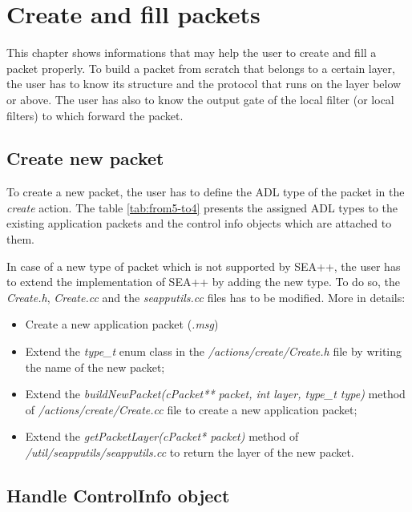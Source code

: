 

\chapter{Create and fill packets}
\label{ch:appendix-C}

This chapter shows informations that may help the user to create and fill a packet properly. To build a packet from scratch that belongs to a certain layer, the user has to know its structure and the protocol that runs on the layer below or above. The user has also to know the output gate of the local filter (or local filters) to which forward the packet.

\section{Create new packet}

To create a new packet, the user has to define the ADL type of the packet in the \emph{create} action. The table \ref{tab:from5-to4} presents the assigned ADL types to the existing application packets and the control info objects which are attached to them.

In case of a new type of packet which is not supported by SEA++, the user has to extend the implementation of SEA++ by adding the new type. To do so, the \emph{Create.h}, \emph{Create.cc} and the \emph{seapputils.cc} files has to be modified. More in details:
%
\begin{itemize}
\item Create a new application packet (\emph{.msg})
\item Extend the \emph{type\_t} enum class in the \emph{/actions/create/Create.h} file by writing the name of the new packet;
\item Extend the \emph{buildNewPacket(cPacket** packet, int layer, type\_t type)} method of \emph{/actions/create/Create.cc} file to create a new application packet;
\item Extend the \emph{getPacketLayer(cPacket* packet)} method of \emph{/util/seapputils/seapputils.cc} to return the layer of the new packet.
\end{itemize}

\section{Handle ControlInfo object}

